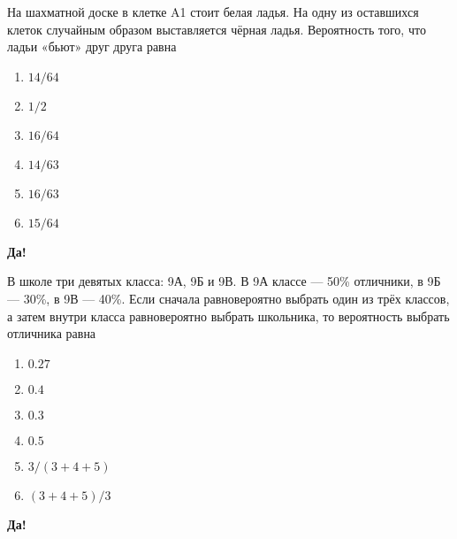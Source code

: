 \documentclass[t]{beamer}
\begin{document}
 \begin{frame} \label{3-Yes} 
\begin{block}{3} 

  На шахматной доске в клетке A1 стоит белая ладья. На одну из оставшихся клеток случайным образом выставляется чёрная ладья. Вероятность того, что ладьи «бьют» друг друга равна
  


 \end{block} 
\begin{enumerate} 
\item[] \hyperlink{3-No}{\beamergotobutton{} $14/64$}
\item[] \hyperlink{3-No}{\beamergotobutton{} $1/2$}
\item[] \hyperlink{3-No}{\beamergotobutton{} $16/64$}
\item[] \hyperlink{3-Yes}{\beamergotobutton{} $14/63$}
\item[] \hyperlink{3-No}{\beamergotobutton{} $16/63$}
\item[] \hyperlink{3-No}{\beamergotobutton{} $15/64$}
\end{enumerate} 

 \textbf{Да!} 
 \hyperlink{4}{}\end{frame} 


 \begin{frame} \label{4-Yes} 
\begin{block}{4} 

  В школе три девятых класса: 9А, 9Б и 9В. В 9А классе — 50\% отличники, в 9Б — 30\%, в 9В — 40\%. Если сначала равновероятно выбрать один из трёх классов, а затем внутри класса равновероятно выбрать школьника, то вероятность выбрать отличника равна
  


 \end{block} 
\begin{enumerate} 
\item[] \hyperlink{4-No}{\beamergotobutton{} $0.27$}
\item[] \hyperlink{4-Yes}{\beamergotobutton{} $0.4$}
\item[] \hyperlink{4-No}{\beamergotobutton{} $0.3$}
\item[] \hyperlink{4-No}{\beamergotobutton{} $0.5$}
\item[] \hyperlink{4-No}{\beamergotobutton{} $3/(3+4+5)$}
\item[] \hyperlink{4-No}{\beamergotobutton{} $(3+4+5)/3$}
\end{enumerate} 

 \textbf{Да!} 
 \hyperlink{5}{}\end{frame} 
\end{document}
